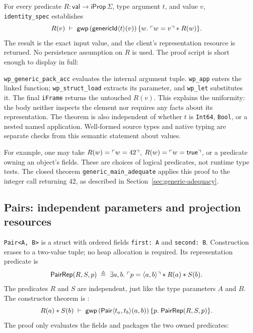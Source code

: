 For every predicate \(R:\mathsf{val}\to\mathsf{iProp}\,\Sigma\),
type argument \(t\), and value \(v\), \texttt{identity\_spec} establishes
\[
R(v)\;\vdash\;
\mathsf{gwp}\,(\mathsf{genericId}\langle t\rangle(v))
  \,\{w.\;\ulcorner w=v \urcorner\mathbin{*} R(w)\}.
\]
The result is the exact input value, and the client's representation
resource is returned. No persistence assumption on \(R\) is used.
The proof script is short enough to display in full:


\texttt{wp\_generic\_pack\_acc} evaluates the internal argument tuple.
\texttt{wp\_app} enters the linked function; \texttt{wp\_struct\_load}
extracts its parameter, and \texttt{wp\_let} substitutes it. The final
\texttt{iFrame} returns the untouched \(R(v)\). This explains the
uniformity: the body neither inspects the element nor requires any facts
about its representation. The theorem is also independent of whether
\(t\) is \texttt{Int64}, \texttt{Bool}, or a nested named application.
Well-formed source types and native typing are separate checks from this
semantic statement about values.

For example, one may take \(R(w)=\ulcorner w=42 \urcorner\),
\(R(w)=\ulcorner w=\mathsf{true} \urcorner\), or a predicate owning an object's
fields. These are choices of logical predicates, not runtime type tests.
The closed theorem \texttt{generic\_main\_adequate} applies this proof
to the integer call returning 42, as described in
Section~\ref{sec:generic-adequacy}.

\subsection{Pairs: independent parameters and projection resources}

\texttt{Pair<A, B>} is a struct with ordered fields \texttt{first: A}
and \texttt{second: B}. Construction erases to a two-value tuple; no heap
allocation is required. Its representation predicate is
\[
\mathsf{PairRep}(R,S,p)\;\triangleq\;
\exists a,b.\;\ulcorner p=\langle a,b\rangle \urcorner\mathbin{*} R(a)\mathbin{*} S(b).
\]
The predicates \(R\) and \(S\) are independent, just like the type
parameters \(A\) and \(B\). The constructor theorem is
:
\[
R(a)\mathbin{*} S(b)\;\vdash\;
\mathsf{gwp}\,(\mathsf{Pair}\langle t_a,t_b\rangle(a,b))
  \,\{p.\;\mathsf{PairRep}(R,S,p)\}.
\]
The proof only evaluates the fields and packages the two owned predicates:


